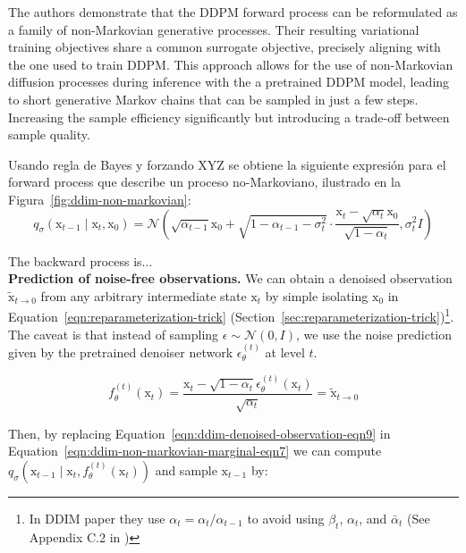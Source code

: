 The authors demonstrate that the DDPM forward process can be reformulated as a family of non-Markovian generative processes. Their resulting variational training objectives share a common surrogate objective, precisely aligning with the one used to train DDPM. This approach allows for the use of non-Markovian diffusion processes during inference with the a pretrained DDPM model, leading to short generative Markov chains that can be sampled in just a few steps. Increasing the sample efficiency significantly but introducing a trade-off between sample quality.

\noindent Usando regla de Bayes y forzando XYZ se obtiene la siguiente expresión para el forward process que describe un proceso no-Markoviano, ilustrado en la Figura~\ref{fig:ddim-non-markovian}:
\begin{equation}\label{eqn:ddim-non-markovian-marginal-eqn7}
    q_{\sigma}(\mathrm{x}_{t-1}\mid\mathrm{x}_{t}, \mathrm{x}_{0}) = \mathcal{N}(\sqrt{\alpha_{t-1}} \mathrm{x}_0 + \sqrt{1 - \alpha_{t-1} - \sigma_{t}^{2}}\cdot\frac{\mathrm{x}_{t} - \sqrt{\alpha_{t}}\mathrm{x}_{0}}{\sqrt{1-\alpha_{t}}}, \sigma_{t}^{2}I)
\end{equation}

\noindent The backward process is...\\

\noindent \textbf{Prediction of noise-free observations.} We can obtain 
a denoised observation $\tilde{\mathrm{x}}_{t\rightarrow 0}$ from any arbitrary
intermediate state $\mathrm{x}_{t}$ by simple isolating $\mathrm{x}_{0}$ in Equation~\ref{eqn:reparameterization-trick} (Section~\ref{sec:reparameterization-trick})\footnote{In DDIM paper they use $\alpha_{t}=\alpha_{t} / \alpha_{t-1}$ to avoid using $\beta_{t}$, $\alpha_{t}$, and $\bar{\alpha}_{t}$ (See Appendix C.2 in \cite{song2020denoising})}. The caveat is that instead of sampling
 $\epsilon\sim\mathcal{N}(0, I)$,  we use the noise prediction given by the pretrained denoiser network $\epsilon_{\theta}^{(t)}$ at level $t$.

\begin{equation}\label{eqn:ddim-denoised-observation-eqn9}
    f_{\theta}^{(t)}(\mathrm{x}_{t}) = \frac{\mathrm{x}_{t} - \sqrt{1-\alpha_{t}}\epsilon_{\theta}^{(t)}(\mathrm{x}_{t})}{\sqrt{\alpha_{t}}} = \tilde{\mathrm{x}}_{t\rightarrow 0} 
\end{equation}

\noindent Then, by replacing Equation~\ref{eqn:ddim-denoised-observation-eqn9} in Equation~\ref{eqn:ddim-non-markovian-marginal-eqn7} we can compute $q_{\sigma}(\mathrm{x}_{t-1}\mid\mathrm{x}_{t}, f_{\theta}^{(t)}(\mathrm{x}_{t}))$ and sample $\mathrm{x}_{t-1}$ by:

